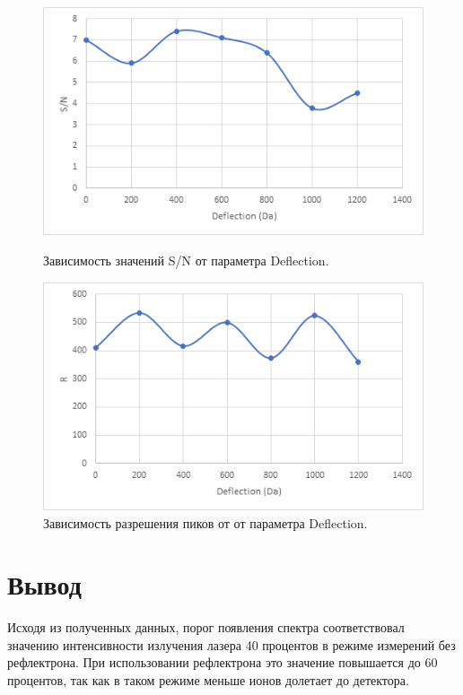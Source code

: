 \documentclass[12pt]{article}
\begin{document}
\begin{flushleft}
\begin{figure}[!h]
\begin{center}
\begin{minipage}[h]{0.4\linewidth}
\includegraphics[width=1.2\linewidth]{29}
\caption{Зависимость значений S/N от параметра Deflection.} %
\label{ris:experimoriginal} %
\end{minipage}
\hfill 
\begin{minipage}[h]{0.4\linewidth}
\includegraphics[width=1.2\linewidth]{30}
\caption{Зависимость разрешения пиков от от параметра Deflection.}
\label{ris:experimcoded}
\end{minipage}
\end{center}
\end{figure}

\section{Вывод}
Исходя из полученных данных, порог появления спектра соответствовал значению интенсивности излучения лазера 40 процентов в режиме измерений 
без рефлектрона. При использовании рефлектрона это значение повышается до 60 процентов, так как в таком режиме меньше ионов долетает до детектора.\\



\end{flushleft}
\end{document}
